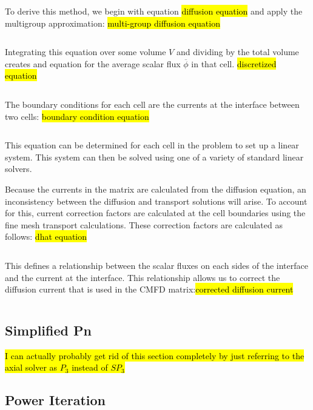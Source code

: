 To derive this method, we begin with equation \hl{diffusion equation} and apply the multigroup approximation:
\hl{multi-group diffusion equation}

\begin{equation}
\end{equation}

Integrating this equation over some volume $V$ and dividing by the total volume creates and equation for the average scalar flux $\overline{\phi}$ in that cell.
\hl{discretized equation}

\begin{equation}
\end{equation}

The boundary conditions for each cell are the currents at the interface between two cells:
\hl{boundary condition equation}

\begin{equation}
\end{equation}

This equation can be determined for each cell in the problem to set up a linear system.  This system can then be solved using one of a variety of standard linear solvers.

Because the currents in the matrix are calculated from the diffusion equation, an inconsistency between the diffusion and transport solutions will arise.  To account for this, current correction factors are calculated at the cell boundaries using the fine mesh transport calculations.  These correction factors are calculated as follows:
\hl{dhat equation}

\begin{equation}
\end{equation}

This defines a relationship between the scalar fluxes on each sides of the interface and the current at the interface.  This relationship allows us to correct the diffusion current that is used in the CMFD matrix:\hl{corrected diffusion current}

\begin{equation}
\end{equation}

\subsection{Simplified Pn}

\hl{I can actually probably get rid of this section completely by just referring to the axial solver as $P_3$ instead of $SP_3$}

\subsection{Power Iteration}